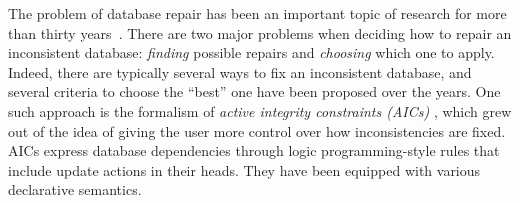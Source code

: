 \documentclass[runningheads]{llncs}
\begin{document}
The problem of database repair has been an important topic of research for more than thirty years~\cite{icdt/Abiteboul88}. 
There are two major problems when deciding how to repair an inconsistent database: \emph{finding} possible repairs and \emph{choosing} which one to apply.
Indeed, there are typically several ways to fix an inconsistent database, and several criteria to choose the ``best'' one have been proposed over the years.
% 
One such approach is the formalism of \emph{active integrity constraints (AICs)} \cite{ppdp/FlescaGZ04}, which grew out of the idea of giving the user more control over how inconsistencies are fixed. 
AICs express database dependencies through logic programming-style rules that include update actions in their heads.
They have been equipped with various declarative semantics.
\end{document}
